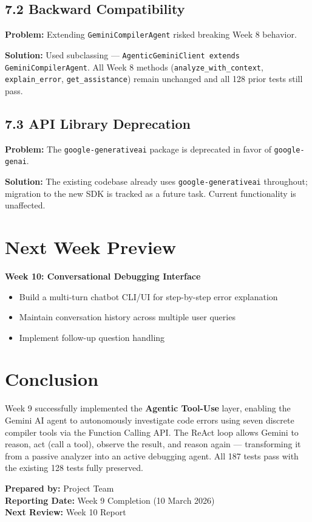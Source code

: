 \documentclass[a4paper,11pt]{article}
\begin{document}
\subsection{7.2 Backward Compatibility}
\textbf{Problem:} Extending \texttt{GeminiCompilerAgent} risked breaking Week 8 behavior.

\textbf{Solution:} Used subclassing --- \texttt{AgenticGeminiClient extends GeminiCompilerAgent}. All Week 8 methods (\texttt{analyze\_with\_context}, \texttt{explain\_error}, \texttt{get\_assistance}) remain unchanged and all 128 prior tests still pass.

\subsection{7.3 API Library Deprecation}
\textbf{Problem:} The \texttt{google-generativeai} package is deprecated in favor of \texttt{google-genai}.

\textbf{Solution:} The existing codebase already uses \texttt{google-generativeai} throughout; migration to the new SDK is tracked as a future task. Current functionality is unaffected.

\section{Next Week Preview}

\textbf{Week 10: Conversational Debugging Interface}

\begin{itemize}[leftmargin=*]
    \item Build a multi-turn chatbot CLI/UI for step-by-step error explanation
    \item Maintain conversation history across multiple user queries
    \item Implement follow-up question handling
\end{itemize}

\section{Conclusion}

Week 9 successfully implemented the \textbf{Agentic Tool-Use} layer, enabling the Gemini AI agent to autonomously investigate code errors using seven discrete compiler tools via the Function Calling API. The ReAct loop allows Gemini to reason, act (call a tool), observe the result, and reason again --- transforming it from a passive analyzer into an active debugging agent. All 187 tests pass with the existing 128 tests fully preserved.

\vspace{5mm}
\noindent\textbf{Prepared by:} Project Team \\
\textbf{Reporting Date:} Week 9 Completion (10 March 2026) \\
\textbf{Next Review:} Week 10 Report
\end{document}
